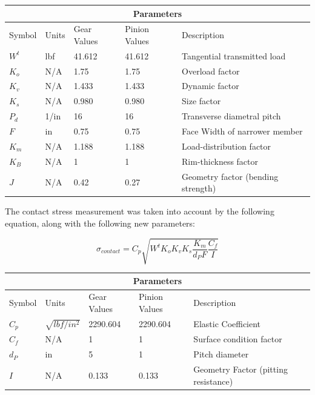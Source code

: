 \documentclass[letterpaper,12pt]{article}
\begin{document}
\begin{center}
	\begin{tabular}{ |p{2cm}||p{2cm}|p{2.3cm}|p{2.3cm}|p{6cm}|  }
		\hline
		\multicolumn{5}{|c|}{Parameters} \\
		\hline
		Symbol & Units & Gear Values & Pinion Values & Description\\
		\hline
		$W^t$ & lbf & 41.612 & 41.612 & Tangential transmitted load\\
		$K_o$ & N/A & 1.75 & 1.75 & Overload factor\\
		$K_v$ & N/A & 1.433 & 1.433 & Dynamic factor\\
		$K_s$ & N/A & 0.980 & 0.980 & Size factor\\
		$P_{d}$ & 1/in & 16 & 16 & Transverse diametral pitch\\
		$F$ & in & 0.75 & 0.75 & Face Width of narrower member\\
		$K_m$ & N/A & 1.188 & 1.188 & Load-distribution factor\\
		$K_{B}$ & N/A & 1 & 1 & Rim-thickness factor\\
		$J$ & N/A & 0.42 & 0.27 & Geometry factor (bending strength)\\
		\hline
	\end{tabular}
\end{center}

\noindent The contact stress measurement was taken into account by the following equation, along with the following new parameters:

\begin{equation}
\sigma_{contact} = C_{p}\sqrt{W^t K_o K_v K_s \frac{K_m}{d_P F}\frac{C_f}{I}}
\end{equation}

\begin{center}
	\begin{tabular}{ |p{2cm}||p{2cm}|p{2.3cm}|p{2.3cm}|p{6cm}|  }
		\hline
		\multicolumn{5}{|c|}{Parameters} \\
		\hline
		Symbol & Units & Gear Values & Pinion Values & Description\\
		\hline
		$C_p$ & $\sqrt{lbf/in^2}$ & 2290.604 & 2290.604 & Elastic Coefficient\\
		$C_f$ & N/A & 1 & 1 & Surface condition factor\\
		$d_P$ & in & 5 & 1 & Pitch diameter\\
		$I$ & N/A & 0.133 & 0.133 & Geometry Factor (pitting resistance)\\
		\hline
	\end{tabular}
\end{center}
\end{document}
